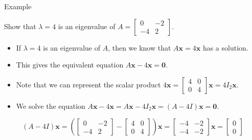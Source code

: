 \documentclass[xcolor=dvipsnames,aspectratio=169,t]{beamer}
\begin{document}
\begin{frame}{Example}
  \bigskip

  Show that $\lambda = 4$ is an eigenvalue of $A = \begin{bmatrix} 0 & -2 \\ -4 & 2 \end{bmatrix}$.
  \medskip

  \begin{itemize}
  \item If $\lambda = 4$ is an eigenvalue of $A$, then we know that $A\mathbf{x} = 4 \mathbf{x}$ has a  solution.
  \smallskip
  \pause
  \item This gives the equivalent equation $A\mathbf{x}  - 4 \mathbf{x} = \mathbf{0}$.
  \smallskip
  \pause
  \item Note that we can represent the scalar product $4 \mathbf{x} = \begin{bmatrix} 4 & 0 \\ 0 & 4 \end{bmatrix} \mathbf{x} = 4 I_2 \mathbf{x}$.
  \medskip
  \item We solve the equation $A\mathbf{x}  - 4 \mathbf{x} = A\mathbf{x} - 4 I_2 \mathbf{x} = (A - 4I)\mathbf{x}= \mathbf{0}$.
  \end{itemize}
  \medskip

  \[ (A - 4I) \mathbf{x} = \left( \begin{bmatrix} 0 & -2 \\ -4 & 2 \end{bmatrix} -  \begin{bmatrix} 4 & 0 \\ 0 & 4 \end{bmatrix} \right) \mathbf{x} = \begin{bmatrix} -4 & -2 \\ -4 & -2 \end{bmatrix} \mathbf{x}= \begin{bmatrix} 0 \\ 0 \end{bmatrix} \]
\end{frame}
\end{document}
